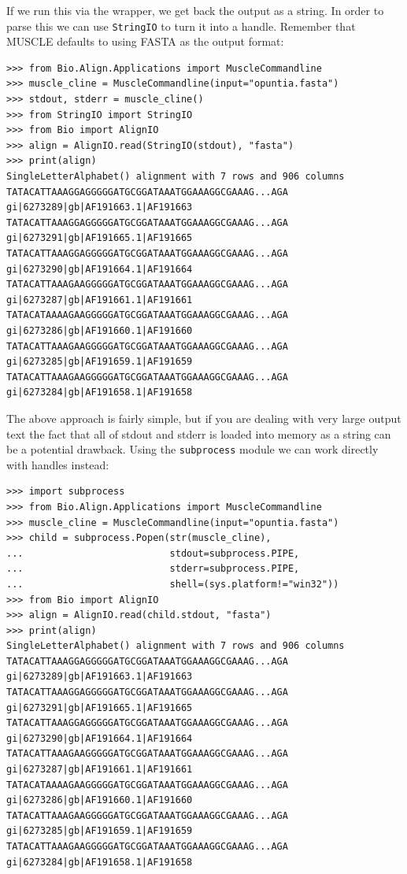 \documentclass{report}
\begin{document}
If we run this via the wrapper, we get back the output as a string. In order
to parse this we can use \verb|StringIO| to turn it into a handle.
Remember that MUSCLE defaults to using FASTA as the output format:

\begin{verbatim}
>>> from Bio.Align.Applications import MuscleCommandline
>>> muscle_cline = MuscleCommandline(input="opuntia.fasta")
>>> stdout, stderr = muscle_cline()
>>> from StringIO import StringIO
>>> from Bio import AlignIO
>>> align = AlignIO.read(StringIO(stdout), "fasta")
>>> print(align)
SingleLetterAlphabet() alignment with 7 rows and 906 columns
TATACATTAAAGGAGGGGGATGCGGATAAATGGAAAGGCGAAAG...AGA gi|6273289|gb|AF191663.1|AF191663
TATACATTAAAGGAGGGGGATGCGGATAAATGGAAAGGCGAAAG...AGA gi|6273291|gb|AF191665.1|AF191665
TATACATTAAAGGAGGGGGATGCGGATAAATGGAAAGGCGAAAG...AGA gi|6273290|gb|AF191664.1|AF191664
TATACATTAAAGAAGGGGGATGCGGATAAATGGAAAGGCGAAAG...AGA gi|6273287|gb|AF191661.1|AF191661
TATACATAAAAGAAGGGGGATGCGGATAAATGGAAAGGCGAAAG...AGA gi|6273286|gb|AF191660.1|AF191660
TATACATTAAAGAAGGGGGATGCGGATAAATGGAAAGGCGAAAG...AGA gi|6273285|gb|AF191659.1|AF191659
TATACATTAAAGAAGGGGGATGCGGATAAATGGAAAGGCGAAAG...AGA gi|6273284|gb|AF191658.1|AF191658
\end{verbatim}

The above approach is fairly simple, but if you are dealing with very large output
text the fact that all of stdout and stderr is loaded into memory as a string can
be a potential drawback. Using the \verb|subprocess| module we can work directly
with handles instead:

\begin{verbatim}
>>> import subprocess
>>> from Bio.Align.Applications import MuscleCommandline
>>> muscle_cline = MuscleCommandline(input="opuntia.fasta")
>>> child = subprocess.Popen(str(muscle_cline),
...                          stdout=subprocess.PIPE,
...                          stderr=subprocess.PIPE,
...                          shell=(sys.platform!="win32"))
>>> from Bio import AlignIO
>>> align = AlignIO.read(child.stdout, "fasta")
>>> print(align)
SingleLetterAlphabet() alignment with 7 rows and 906 columns
TATACATTAAAGGAGGGGGATGCGGATAAATGGAAAGGCGAAAG...AGA gi|6273289|gb|AF191663.1|AF191663
TATACATTAAAGGAGGGGGATGCGGATAAATGGAAAGGCGAAAG...AGA gi|6273291|gb|AF191665.1|AF191665
TATACATTAAAGGAGGGGGATGCGGATAAATGGAAAGGCGAAAG...AGA gi|6273290|gb|AF191664.1|AF191664
TATACATTAAAGAAGGGGGATGCGGATAAATGGAAAGGCGAAAG...AGA gi|6273287|gb|AF191661.1|AF191661
TATACATAAAAGAAGGGGGATGCGGATAAATGGAAAGGCGAAAG...AGA gi|6273286|gb|AF191660.1|AF191660
TATACATTAAAGAAGGGGGATGCGGATAAATGGAAAGGCGAAAG...AGA gi|6273285|gb|AF191659.1|AF191659
TATACATTAAAGAAGGGGGATGCGGATAAATGGAAAGGCGAAAG...AGA gi|6273284|gb|AF191658.1|AF191658
\end{verbatim}
\end{document}
